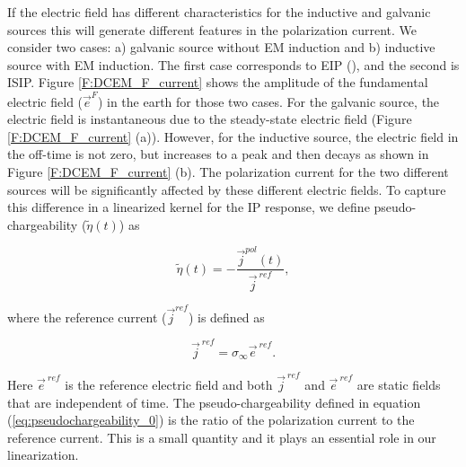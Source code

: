 \documentclass[extra,mreferee]{gji}
\newcommand{\siginf}{\sigma_\infty}
\renewcommand {\j}  { {\vec j} }
\newcommand {\e}  { {\vec e} }
\newcommand{\peta}{\tilde{\eta}}
\newcommand{\eref}{\e^{\ ref}}
\begin{document}
If the electric field has different characteristics for the inductive and galvanic sources this will generate different features in the polarization current.  
We consider two cases: a) galvanic source without EM induction and b) inductive source with EM induction. The first case corresponds to EIP (\cite{seigel1959}), and the second is ISIP.
Figure \ref{F:DCEM_F_current} shows the amplitude of the fundamental electric field ($\e^{F}$) in the earth for those two cases. 
For the galvanic source, the electric field is instantaneous due to the steady-state electric field (Figure \ref{F:DCEM_F_current} (a)). 
However, for the inductive source, the electric field in the off-time is not zero, but increases to a peak and then decays as shown in Figure \ref{F:DCEM_F_current} (b). 
The polarization current for the two different sources will be significantly affected by these different electric fields. 
To capture this difference in a linearized kernel for the IP response, we define pseudo-chargeability ($\peta(t)$) as 
\begin{linenomath*}
\begin{equation}
  \peta(t) = -\frac{\j^{pol}(t)}{\j^{\ ref}},
  \label{eq:pseudochargeability_0}
\end{equation}
\end{linenomath*}
where the reference current ($\j^{ref}$) is defined as 
\begin{linenomath*}
\begin{equation}
  \j^{\ ref} = \siginf \eref.
  \label{eq:reference_current}
\end{equation}
\end{linenomath*}
Here $\eref$ is the reference electric field and both $\j^{\ ref}$ and $\eref$ are static fields that are independent of time. 
The pseudo-chargeability defined in equation (\ref{eq:pseudochargeability_0})  is the ratio of  the polarization current to the reference current. This is a small quantity and it plays an essential role in our linearization. 
\end{document}
